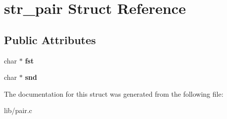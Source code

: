 \hypertarget{structstr__pair}{}\section{str\+\_\+pair Struct Reference}
\label{structstr__pair}
\subsection*{Public Attributes}
\begin{DoxyCompactItemize}
\item 
char $\ast$ {\bfseries fst}\hypertarget{structstr__pair_a300d3bb83b7913be6bbe215a69e2e915}{}\label{structstr__pair_a300d3bb83b7913be6bbe215a69e2e915}

\item 
char $\ast$ {\bfseries snd}\hypertarget{structstr__pair_aa1402d619cdb999b4a66c4dbbc08caf5}{}\label{structstr__pair_aa1402d619cdb999b4a66c4dbbc08caf5}

\end{DoxyCompactItemize}


The documentation for this struct was generated from the following file\+:\begin{DoxyCompactItemize}
\item 
lib/pair.\+c\end{DoxyCompactItemize}
